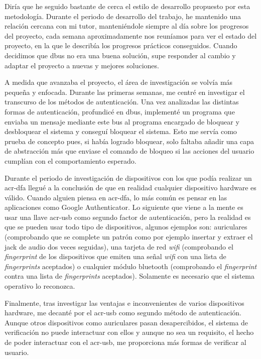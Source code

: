 \documentclass[twoside, titlepage, 12pt, a4paper]{article}
\begin{document}
Diría que he seguido bastante de cerca el estilo de desarrollo propuesto por esta metodología. Durante el periodo de desarrollo del trabajo, he mantenido una relación cercana con mi tutor, manteniéndole siempre al día sobre los progresos del proyecto, cada semana aproximadamente nos reuníamos para ver el estado del proyecto, en la que le describía los progresos prácticos conseguidos. Cuando decidimos que \gls{dbus} no era una buena solución, supe responder al cambio y adaptar el proyecto a nuevas y mejores soluciones. \par
A medida que avanzaba el proyecto, el área de investigación se volvía más pequeña y enfocada. Durante las primeras semanas, me centré en investigar el transcurso de los métodos de autenticación. Una vez analizadas las distintas formas de autenticación, profundicé en \gls{dbus}, implementé un programa que enviaba un mensaje mediante este bus al programa encargado de bloquear y desbloquear el sistema y conseguí bloquear el sistema. Esto me servía como prueba de concepto pues, si había logrado bloquear, solo faltaba añadir una capa de abstracción más que enviase el comando de bloqueo si las acciones del usuario cumplían con el comportamiento esperado. \par
Durante el periodo de investigación de dispositivos con los que podía realizar un \gls{acr-dfa} llegué a la conclusión de que en realidad cualquier dispositivo hardware es válido. Cuando alguien piensa en \gls{acr-dfa}, lo más común es pensar en las aplicaciones como Google Authenticator. Lo siguiente que viene a la mente es usar una llave \gls{acr-usb} como segundo factor de autenticación, pero la realidad es que se pueden usar todo tipo de dispositivos, algunos ejemplos son: auriculares (comprobando que se complete un patrón como por ejemplo insertar y extraer el jack de audio dos veces seguidas), una tarjeta de red \textit{\gls{wifi}} (comprobando  el \textit{\gls{fingerprint}} de los dispositivos que emiten una señal \textit{\gls{wifi}} con una lista de \textit{\gls{fingerprint}s} aceptados) o cualquier módulo \gls{bluetooth} (comprobando el \textit{\gls{fingerprint}} contra una lista de \textit{\gls{fingerprint}s} aceptados). Solamente es necesario que el sistema operativo lo reconozca. \par
Finalmente, tras investigar las ventajas e inconvenientes de varios dispositivos hardware, me decanté por el \gls{acr-usb} como segundo método de autenticación. Aunque otros dispositivos como auriculares pasan desapercibidos, el sistema de verificación no puede interactuar con ellos y aunque no sea un requisito, el hecho de poder interactuar con el \gls{acr-usb}, me proporciona más formas de verificar al usuario.
\clearpage
\end{document}
